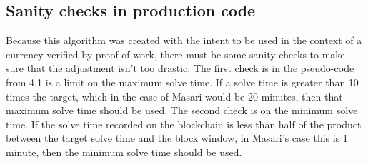 \documentclass{article}
\begin{document}
\subsection{Sanity checks in production code}
Because this algorithm was created with the intent to be used in the context of a currency verified by proof-of-work, there must be some sanity checks to make sure that the adjustment isn't too drastic. The first check is in the pseudo-code from 4.1 is a limit on the maximum solve time. If a solve time is greater than 10 times the target, which in the case of Masari would be 20 minutes, then that maximum solve time should be used. The second check is on the minimum solve time. If the solve time recorded on the blockchain is less than half of the product between  the target solve time and the block window, in Masari's case this is 1 minute, then the minimum solve time should be used.

 
\end{document}
